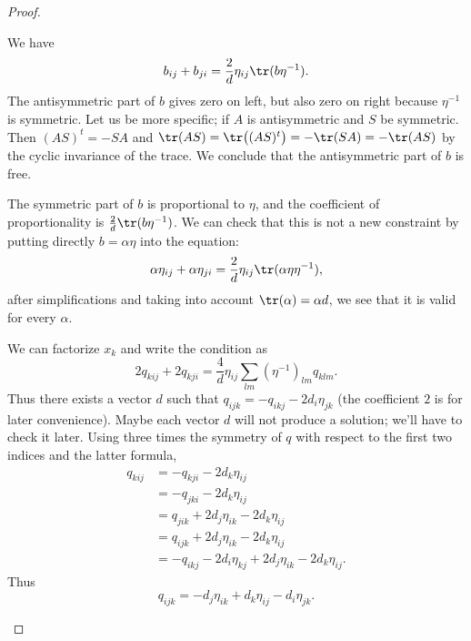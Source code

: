 \begin{proof}
	\begin{subproof}
		We have
		\begin{equation}
			b_{ij}+b_{ji}=\frac{ 2 }{ d }\eta_{ij}\tr(b\eta^{-1}).
		\end{equation}
		The antisymmetric part of \( b\) gives zero on left, but also zero on right because \( \eta^{-1}\) is symmetric. Let us be more specific; if \( A\) is antisymmetric and \( S\) be symmetric. Then \( (AS)^t=-SA\) and \( \tr(AS)=\tr\big( (AS)^t \big)=-\tr(SA)=-\tr(AS)\) by the cyclic invariance of the trace. We conclude that the antisymmetric part of \( b\) is free.

		The symmetric part of \( b\) is proportional to \( \eta\), and the coefficient of proportionality is \( \frac{ 2 }{ d }\tr(b\eta^{-1})\). We can check that this is not a new constraint by putting directly \( b=\alpha\eta\) into the equation:
		\begin{equation}
			\alpha\eta_{ij}+\alpha\eta_{ji}=\frac{ 2 }{ d }\eta_{ij}\tr(\alpha\eta\eta^{-1}),
		\end{equation}
		after simplifications and taking into account \( \tr(\alpha)=\alpha d\), we see that it is valid for every \( \alpha\).

		We can factorize \( x_k\) and write the condition as
		\begin{equation}
			2q_{kij}+2q_{kji}=\frac{ 4 }{ d }\eta_{ij}\sum_{lm}(\eta^{-1})_{lm}q_{klm}.
		\end{equation}
		Thus there exists a vector \( d\) such that \( q_{ijk}=-q_{ikj}-2d_i\eta_{jk}\) (the coefficient \( 2\) is for later convenience). Maybe each vector \( d\) will not produce a solution; we'll have to check it later. Using three times the symmetry of \( q\) with respect to the first two indices and the latter formula,
		\begin{subequations}
			\begin{align}
				q_{kij} & =-q_{kji}-2d_k\eta_{ij}                              \\
				        & =-q_{jki}-2d_k\eta_{ij}                              \\
				        & =q_{jik}+2d_j\eta_{ik}-2d_k\eta_{ij}                 \\
				        & =q_{ijk}+2d_j\eta_{ik}-2d_k\eta_{ij}                 \\
				        & =-q_{ikj}-2d_i\eta_{kj}+2d_j\eta_{ik}-2d_k\eta_{ij}.
			\end{align}
		\end{subequations}
		Thus
		\begin{equation}    \label{EQooKZVTooWSMmyM}
			q_{ijk}=-d_j\eta_{ik}+d_k\eta_{ij}-d_i\eta_{jk}.
		\end{equation}
	\end{subproof}


\end{proof}
